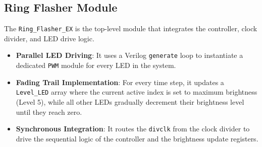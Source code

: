 \subsection{ Ring Flasher Module}
The \texttt{Ring\_Flasher\_EX} is the top-level module that integrates the controller, clock divider, and LED drive logic.
\begin{itemize}[noitemsep]
    \item \textbf{Parallel LED Driving}: It uses a Verilog \texttt{generate} loop to instantiate a dedicated \texttt{PWM} module for every LED in the system.
    \item \textbf{Fading Trail Implementation}: For every time step, it updates a \texttt{Level\_LED} array where the current active index is set to maximum brightness (Level 5), while all other LEDs gradually decrement their brightness level until they reach zero.
    \item \textbf{Synchronous Integration}: It routes the \texttt{divclk} from the clock divider to drive the sequential logic of the controller and the brightness update registers.
\end{itemize}
